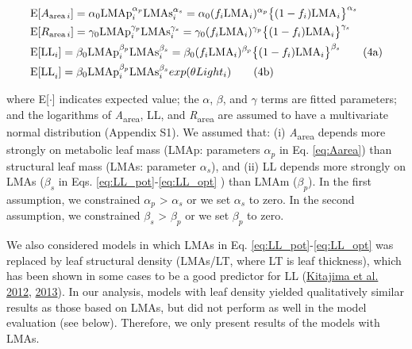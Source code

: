 \documentclass[
  12pt,
  a4paper,
,tablecaptionabove
]{scrartcl}
\begin{document}
\begin{align}
& \mathrm{E}[A_{\mathrm{area} \, i}]
= \alpha_0\mathrm{LMAp}_{i}^{\alpha_p}\mathrm{LMAs}_i^{\alpha_s}  =  \alpha_0 (f_i \mathrm{LMA}_{i})^{\alpha_p} \bigl\{(1-f_i) \mathrm{LMA}_{i}\bigr\}^{\alpha_s} \label{eq:Aarea} \\
& \mathrm{E}[R_{\mathrm{area} \, i}]
= \gamma_0\mathrm{LMAp}_{i}^{\gamma_p} \mathrm{LMAs}_{i}^{\gamma_s}
= \gamma_0 (f_i \mathrm{LMA}_{i})^{\gamma_p} \bigl\{(1-f_i)\mathrm{LMA}_{i}\bigr\}^{\gamma_s} \label{eq:Rarea} \\
& \mathrm{E}[\mathrm{LL}_i] = \beta_0\mathrm{LMAp}_{i}^{\beta_p} \mathrm{LMAs}_{i}^{\beta_s}  = \beta_0 (f_i \mathrm{LMA}_{i})^{\beta_p} \bigl\{(1-f_i) \mathrm{LMA}_{i}\bigr\}^{\beta_s} \label{eq:LL_pot} \tag{4a}  \\
& \mathrm{E[LL}_i] = \beta_0\mathrm{LMAp}_{i}^{\beta_p} \mathrm{LMAs}_{i}^{\beta_s} exp(\theta Light_i)  \stepcounter{equation} \label{eq:LL_opt} \tag{4b}
\end{align}

where E{[}\(\cdot\){]} indicates expected value; the \(\alpha\),
\(\beta\), and \(\gamma\) terms are fitted parameters; and the
logarithms of \emph{A}\textsubscript{area}, LL, and
\emph{R}\textsubscript{area} are assumed to have a multivariate normal
distribution (Appendix S1). We assumed that: (i)
\emph{A}\textsubscript{area} depends more strongly on metabolic leaf
mass (LMAp: parameters \(\alpha_p\) in Eq. \ref{eq:Aarea}) than
structural leaf mass (LMAs: parameter \(\alpha_s\)), and (ii) LL depends
more strongly on LMAs (\(\beta_s\) in Eqs.
\ref{eq:LL_pot}-\ref{eq:LL_opt} ) than LMAm (\(\beta_p\)). In the first
assumption, we constrained \(\alpha_p\) \textgreater{} \(\alpha_s\) or
we set \(\alpha_s\) to zero. In the second assumption, we constrained
\(\beta_s\) \textgreater{} \(\beta_p\) or we set \(\beta_p\) to zero.

We also considered models in which LMAs in Eq.
\ref{eq:LL_pot}-\ref{eq:LL_opt} was replaced by leaf structural density
(LMAs/LT, where LT is leaf thickness), which has been shown in some
cases to be a good predictor for LL
(\protect\hyperlink{ref-Kitajima2012}{Kitajima et al. 2012},
\protect\hyperlink{ref-Kitajima2013}{2013}). In our analysis, models
with leaf density yielded qualitatively similar results as those based
on LMAs, but did not perform as well in the model evaluation (see
below). Therefore, we only present results of the models with LMAs.
\end{document}
